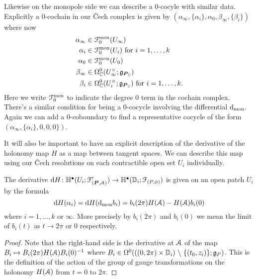 \documentclass[10pt, oneside]{article}
\renewcommand{\d}{\mathrm{d}}
\begin{document}
Likewise on the monopole side we can describe a 0-cocyle with similar data.  Explicitly a 0-cochain in our \v Cech complex is given by $(\alpha_\infty, \{\alpha_i\}, \alpha_0, \beta_\infty, \{\beta_i\})$ where now 
\begin{align*}
 \alpha_\infty &\in \mathcal{F}^{\mathrm{mon}}_0(U_\infty) \\
 \alpha_i &\in \mathcal{F}^{\mathrm{mon}}_0(U_i) \text{ for } i = 1,\ldots,k \\
 \alpha_0 &\in \mathcal{F}^{\mathrm{mon}}_0(U_0) \\
 \beta_\infty &\in \Omega^0_{\mathbb{C}}(U_\infty^\times; \mathfrak{g}_{\boldsymbol{P}_{\mathbb{C}}}) \\
 \beta_i &\in \Omega^0_{\mathbb{C}}(U_i^\times; \mathfrak{g}_{\boldsymbol{P}_{\mathbb{C}}}) \text{ for } i=1,\ldots,k.
\end{align*}
Here we write $\mathcal{F}^{\mathrm{mon}}_0$ to indicate the degree 0 term in the cochain complex.  There's a similar condition for being a 0-cocycle involving the differential $\d_{\mr{mon}}$.  Again we can add a 0-coboundary to find a representative cocycle of the form $(\alpha_\infty, \{\alpha_i\}, 0,0,0\})$.

It will also be important to have an explicit description of the derivative of the holonomy map $H$ as a map between tangent spaces.  We can describe this map using our \v Cech resolutions on each contractible open set $U_i$ individually.

\begin{prop} \label{local_derivative_description_prop}
The derivative $\d H \colon \bb H^\bullet(U_i ; \mc F'_{(\bo P,\mc A)}) \to \bb H^\bullet(\bb D_i; \mc F_{(P,\phi)})$ is given on an open patch $U_i$ by the formula
\[\d H(\alpha_i) = \d H(\d_{\mr{mon}} b_i) = b_i(2\pi)H(\mc A) - H(\mc A)b_i(0)\]
where $i = 1, \ldots, k$ or $\infty$.  More precisely by $b_i(2\pi)$ and $b_i(0)$ we mean the limit of $b_i(t)$ as $t \to 2\pi$ or 0 respectively.
\end{prop}

\begin{proof}
Note that the right-hand side is the derivative at $\mathcal{A}$ of the map $B_i \mapsto B_i(2\pi)H(\mathcal{A})B_i(0)^{-1}$ where $B_i \in \Omega^0(((0,2\pi) \times \mathbb{D}_i) \ \backslash \  \{(t_0,z_i)\}; \mathfrak{g}_P)$.  This is the definition of the action of the group of gauge transformations on the holonomy $H(\mathcal{A})$ from $t=0$ to $2\pi$. 
\end{proof}
\end{document}
